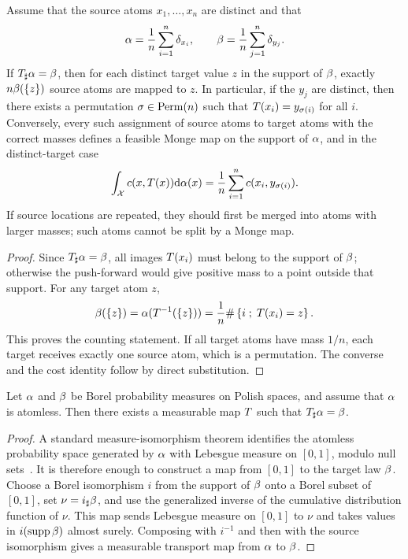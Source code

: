 \begin{prop}\label{prop-empirical-monge-matching}
	Assume that the source atoms $x_1,\ldots,x_n$ are distinct and that
	\[
		\alpha=\frac1n\sum_{i=1}^n\delta_{x_i},
		\qquad
		\beta=\frac1n\sum_{j=1}^n\delta_{y_j}.
	\]
	If $T_\sharp\alpha=\beta$, then for each distinct target value $z$ in the support of $\beta$, exactly $n\beta(\{z\})$ source atoms are mapped to $z$. In particular, if the $y_j$ are distinct, then there exists a permutation $\sigma\in\mathrm{Perm}(n)$ such that $T(x_i)=y_{\sigma(i)}$ for all $i$. Conversely, every such assignment of source atoms to target atoms with the correct masses defines a feasible Monge map on the support of $\alpha$, and in the distinct-target case
	\[
		\int_{\mathcal{X}} c(x,T(x))\mathrm{d}\alpha(x)=\frac1n\sum_{i=1}^n c(x_i,y_{\sigma(i)}).
	\]
	If source locations are repeated, they should first be merged into atoms with larger masses; such atoms cannot be split by a Monge map.
\end{prop}
\begin{proof}
	Since $T_\sharp\alpha=\beta$, all images $T(x_i)$ must belong to the support of $\beta$; otherwise the push-forward would give positive mass to a point outside that support. For any target atom $z$,
	\[
		\beta(\{z\})=\alpha(T^{-1}(\{z\}))=\frac1n\#\left\{ i \;;\; T(x_i)=z \right\}.
	\]
	This proves the counting statement. If all target atoms have mass $1/n$, each target receives exactly one source atom, which is a permutation. The converse and the cost identity follow by direct substitution.
\end{proof}

\begin{prop}\label{prop-existence-transport-map-atomless}
	Let $\alpha$ and $\beta$ be Borel probability measures on Polish spaces, and assume that $\alpha$ is atomless. Then there exists a measurable map $T$ such that $T_\sharp\alpha=\beta$.
\end{prop}
\begin{proof}
	A standard measure-isomorphism theorem identifies the atomless probability space generated by $\alpha$ with Lebesgue measure on $[0,1]$, modulo null sets~\cite{bogachev2007measure}. It is therefore enough to construct a map from $[0,1]$ to the target law $\beta$. Choose a Borel isomorphism $i$ from the support of $\beta$ onto a Borel subset of $[0,1]$, set $\nu=i_\sharp\beta$, and use the generalized inverse of the cumulative distribution function of $\nu$. This map sends Lebesgue measure on $[0,1]$ to $\nu$ and takes values in $i(\operatorname{supp}\beta)$ almost surely. Composing with $i^{-1}$ and then with the source isomorphism gives a measurable transport map from $\alpha$ to $\beta$.
\end{proof}

